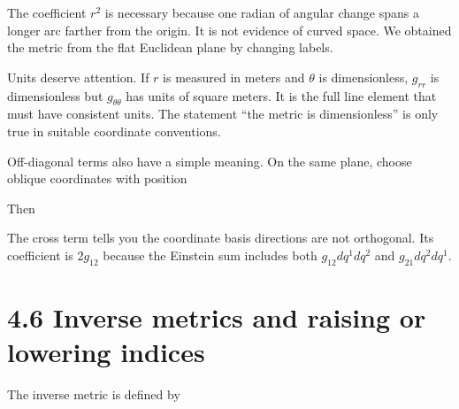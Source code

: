 \documentclass[
  11pt,
  letterpaper,
  oneside,
  openany]{scrbook}
\begin{document}
The coefficient \(r^2\) is necessary because one radian of angular
change spans a longer arc farther from the origin. It is not evidence of
curved space. We obtained the metric from the flat Euclidean plane by
changing labels.

Units deserve attention. If \(r\) is measured in meters and \(\theta\)
is dimensionless, \(g_{rr}\) is dimensionless but \(g_{\theta\theta}\)
has units of square meters. It is the full line element that must have
consistent units. The statement ``the metric is dimensionless'' is only
true in suitable coordinate conventions.

Off-diagonal terms also have a simple meaning. On the same plane, choose
oblique coordinates with position

\begin{center}
\begingroup
{}
\ifdim\wd\grmathbox>\linewidth
\resizebox{\linewidth}{!}{\usebox{\grmathbox}}
\else\usebox{\grmathbox}\fi
\endgroup
\end{center}

Then

\begin{center}
\begingroup
{}
\ifdim\wd\grmathbox>\linewidth
\resizebox{\linewidth}{!}{\usebox{\grmathbox}}
\else\usebox{\grmathbox}\fi
\endgroup
\end{center}

The cross term tells you the coordinate basis directions are not
orthogonal. Its coefficient is \(2g_{12}\) because the Einstein sum
includes both \(g_{12}dq^1dq^2\) and \(g_{21}dq^2dq^1\).

\hypertarget{inverse-metrics-and-raising-or-lowering-indices}{%
\section{4.6 Inverse metrics and raising or lowering
indices}\label{inverse-metrics-and-raising-or-lowering-indices}}

The inverse metric is defined by

\begin{center}
\begingroup
{}
\ifdim\wd\grmathbox>\linewidth
\resizebox{\linewidth}{!}{\usebox{\grmathbox}}
\else\usebox{\grmathbox}\fi
\endgroup
\end{center}
\end{document}
